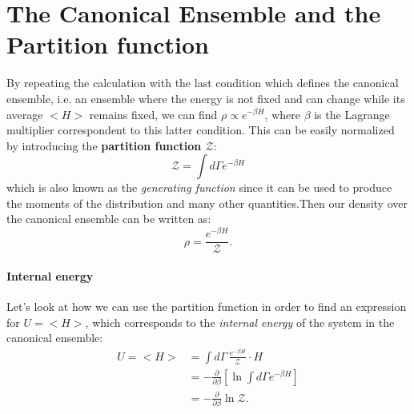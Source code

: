 \section{The Canonical Ensemble and the Partition function}
By repeating the calculation with the last condition which defines the canonical ensemble, i.e. an ensemble where the energy is not fixed and can change while its average $<H>$ remains fixed, we can find $\rho \propto e^{-\beta H}$, where $\beta$ is the Lagrange multiplier correspondent to this latter condition. This can be easily normalized by introducing the \textbf{partition function $\mathcal{Z}$}:
\begin{equation}
    \mathcal{Z}=\int d\Gamma e^{-\beta H}
\end{equation}
which is also known as the \textit{generating function} since it can be used to produce the moments of the distribution and many other quantities.Then our density over the canonical ensemble can be written as:
\begin{equation}
    \rho=\frac{e^{-\beta H}}{\mathcal{Z}}.
\end{equation}
\paragraph*{Internal energy}
Let's look at how we can use the partition function in order to find an expression for $U=<H>$, which corresponds to the \textit{internal energy} of the system in the canonical ensemble:
\begin{equation}
\begin{split}
    U=<H> & =\int d\Gamma\, \frac{e^{-\beta H}}{\mathcal{Z}}\cdot H \\
    & = -\frac{\partial}{\partial \beta}\left[\ln{\int d\Gamma e^{- \beta H}}\right] \\
    & = -\frac{\partial}{\partial \beta}\ln{\mathcal{Z}}.
\end{split}
\end{equation}

